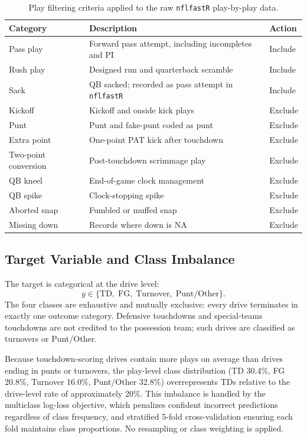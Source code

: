 \documentclass[12pt,a4paper]{article}
\begin{document}
\begin{table}[htbp]
  \centering
  \caption{Play filtering criteria applied to the raw \texttt{nflfastR} play-by-play data.}
  \label{tab:filtering}
  \small
  \begin{tabularx}{\textwidth}{lXl}
    \toprule
    \textbf{Category} & \textbf{Description} & \textbf{Action} \\
    \midrule
    Pass play & Forward pass attempt, including incompletes and PI & Include \\
    Rush play & Designed run and quarterback scramble & Include \\
    Sack & QB sacked; recorded as pass attempt in \texttt{nflfastR} & Include \\
    \midrule
    Kickoff & Kickoff and onside kick plays & Exclude \\
    Punt & Punt and fake-punt coded as punt & Exclude \\
    Extra point & One-point PAT kick after touchdown & Exclude \\
    Two-point conversion & Post-touchdown scrimmage play & Exclude \\
    QB kneel & End-of-game clock management & Exclude \\
    QB spike & Clock-stopping spike & Exclude \\
    Aborted snap & Fumbled or muffed snap & Exclude \\
    Missing down & Records where down is NA & Exclude \\
    \bottomrule
  \end{tabularx}
\end{table}

\subsection{Target Variable and Class Imbalance}

The target is categorical at the drive level:
\[
  y \in \{\text{TD},\; \text{FG},\; \text{Turnover},\; \text{Punt/Other}\}.
\]
The four classes are exhaustive and mutually exclusive: every drive terminates in exactly one outcome category. Defensive touchdowns and special-teams touchdowns are not credited to the possession team; such drives are classified as turnovers or Punt/Other.

Because touchdown-scoring drives contain more plays on average than drives ending in punts or turnovers, the play-level class distribution (TD 30.4\%, FG 20.8\%, Turnover 16.0\%, Punt/Other 32.8\%) overrepresents TDs relative to the drive-level rate of approximately 20\%. This imbalance is handled by the multiclass log-loss objective, which penalizes confident incorrect predictions regardless of class frequency, and stratified 5-fold cross-validation ensuring each fold maintains class proportions. No resampling or class weighting is applied.
\end{document}
